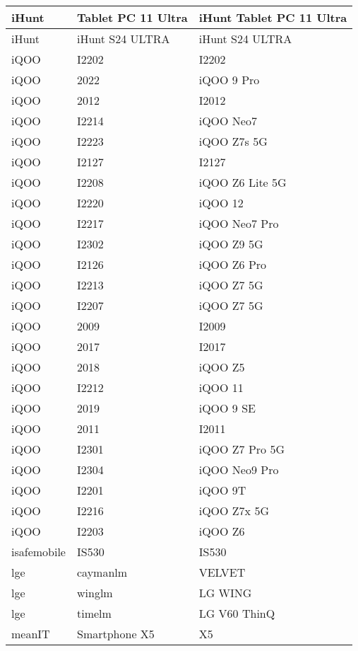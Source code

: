 \begin{tabularx}{\linewidth}{|l|X|X|}
        iHunt & Tablet PC 11 Ultra & iHunt Tablet PC 11 Ultra \\ \hline
        iHunt & iHunt S24 ULTRA & iHunt S24 ULTRA \\ \hline
        iQOO & I2202 & I2202 \\ \hline
        iQOO & 2022 & iQOO 9 Pro \\ \hline
        iQOO & 2012 & I2012 \\ \hline
        iQOO & I2214 & iQOO Neo7 \\ \hline
        iQOO & I2223 & iQOO Z7s 5G \\ \hline
        iQOO & I2127 & I2127 \\ \hline
        iQOO & I2208 & iQOO Z6 Lite 5G \\ \hline
        iQOO & I2220 & iQOO 12 \\ \hline
        iQOO & I2217 & iQOO Neo7 Pro \\ \hline
        iQOO & I2302 & iQOO Z9 5G \\ \hline
        iQOO & I2126 & iQOO Z6 Pro \\ \hline
        iQOO & I2213 & iQOO Z7 5G \\ \hline
        iQOO & I2207 & iQOO Z7 5G \\ \hline
        iQOO & 2009 & I2009 \\ \hline
        iQOO & 2017 & I2017 \\ \hline
        iQOO & 2018 & iQOO Z5 \\ \hline
        iQOO & I2212 & iQOO 11 \\ \hline
        iQOO & 2019 & iQOO 9 SE \\ \hline
        iQOO & 2011 & I2011 \\ \hline
        iQOO & I2301 & iQOO Z7 Pro 5G \\ \hline
        iQOO & I2304 & iQOO Neo9 Pro \\ \hline
        iQOO & I2201 & iQOO 9T \\ \hline
        iQOO & I2216 & iQOO Z7x 5G \\ \hline
        iQOO & I2203 & iQOO Z6 \\ \hline
        isafemobile & IS530 & IS530 \\ \hline
        lge & caymanlm & VELVET \\ \hline
        lge & winglm & LG WING \\ \hline
        lge & timelm & LG V60 ThinQ \\ \hline
        meanIT & Smartphone X5 & X5 \\ \hline

\end{tabularx}
